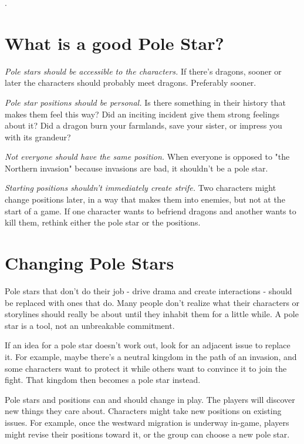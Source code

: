 \documentclass[10pt,oneside,letterpaper,landscape]{memoir}
\begin{document}
\begin{multicols}{3}
\columnbreak

{\color{white}.}
\vspace{19mm}

\section{What is a good Pole Star?}

\textit{Pole stars should be accessible to the characters.} If there's dragons, sooner or later the characters should probably meet dragons. Preferably sooner.

\textit{Pole star positions should be personal.} Is there something in their history that makes them feel this way? Did an inciting incident give them strong feelings about it? Did a dragon burn your farmlands, save your sister, or impress you with its grandeur?

\textit{Not everyone should have the same position.} When everyone is opposed to "the Northern invasion" because invasions are bad, it shouldn't be a pole star.

\textit{Starting positions shouldn't immediately create strife.} Two characters might change positions later, in a way that makes them into enemies, but not at the start of a game. If one character wants to befriend dragons and another wants to kill them, rethink either the pole star or the positions.

\section{Changing Pole Stars}

Pole stars that don't do their job - drive drama and create interactions - should be replaced with ones that do. Many people don't realize what their characters or storylines should really be about until they inhabit them for a little while. A pole star is a tool, not an unbreakable commitment.

If an idea for a pole star doesn't work out, look for an adjacent issue to replace it. For example, maybe there's a neutral kingdom in the path of an invasion, and some characters want to protect it while others want to convince it to join the fight. That kingdom then becomes a pole star instead.

Pole stars and positions can and should change in play. The players will discover new things they care about. Characters might take new positions on existing issues. For example, once the westward migration is underway in-game, players might revise their positions toward it, or the group can choose a new pole star.


\end{multicols}
\end{document}
